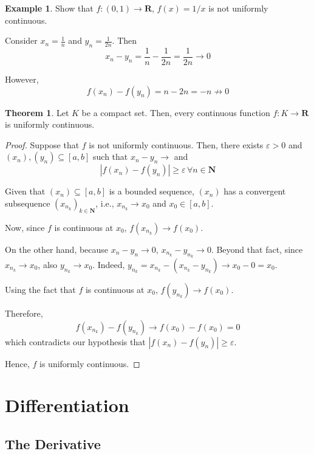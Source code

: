 \documentclass[12pt,a4paper]{article}
\theoremstyle{definition}
\newtheorem{theorem}{Theorem}[section]
\newtheorem{example}{Example}[section]
\begin{document}
\begin{example}
	Show that $f : (0,1) \longrightarrow \textbf{R}$, $f(x) = 1/x$ is not uniformly continuous.
	
	Consider $x_n = \frac{1}{n}$ and $y_n = \frac{1}{2n}$. Then
	\[
		x_n - y_n = \frac{1}{n} - \frac{1}{2n} = \frac{1}{2n} \longrightarrow 0
	\]
	
	However,
	\[
		f(x_n) - f(y_n) = n - 2n = -n \not\longrightarrow 0
	\]
\end{example}

\begin{theorem}
	Let $K$ be a compact set. Then, every continuous function $f : K \longrightarrow \textbf{R}$ is uniformly continuous.
\end{theorem}

\begin{proof}
	Suppose that $f$ is not uniformly continuous. Then, there exists $\varepsilon > 0$ and $(x_n), (y_n) \subseteq [a,b]$ such that $x_n - y_n \longrightarrow $ and
	\[
		|f(x_n) - f(y_n)| \geq \varepsilon \, \forall n \in \textbf{N}
	\]
	
	Given that $(x_n) \subseteq [a,b]$ is a bounded sequence, $(x_n)$ has a convergent subsequence $(x_{n_k})_{k \in \textbf{N}}$, i.e., $x_{n_k} \longrightarrow x_0$ and $x_0 \in [a,b]$.
	
	Now, since $f$ is continuous at $x_0$, $f(x_{n_k}) \longrightarrow f(x_0)$.
	
	On the other hand, because $x_n - y_n \longrightarrow 0$, $x_{n_k} - y_{n_k} \longrightarrow 0$. Beyond that fact, since $x_{n_k} \longrightarrow x_0$, also $y_{n_k} \longrightarrow x_0$. Indeed, $y_{n_k} = x_{n_k} - (x_{n_k} - y_{n_k}) \longrightarrow x_0 - 0 = x_0$.
	
	Using the fact that $f$ is continuous at $x_0$, $f(y_{n_k}) \longrightarrow f(x_0)$. 
	
	Therefore,
	\[
		f(x_{n_k}) - f(y_{n_k}) \longrightarrow f(x_0) - f(x_0) = 0
	\]
	which contradicts our hypothesis that $|f(x_n) - f(y_n)| \geq \varepsilon$.
	
	Hence, $f$ is uniformly continuous.
\end{proof}

\newpage

\section{Differentiation}

\subsection{The Derivative}
\end{document}
